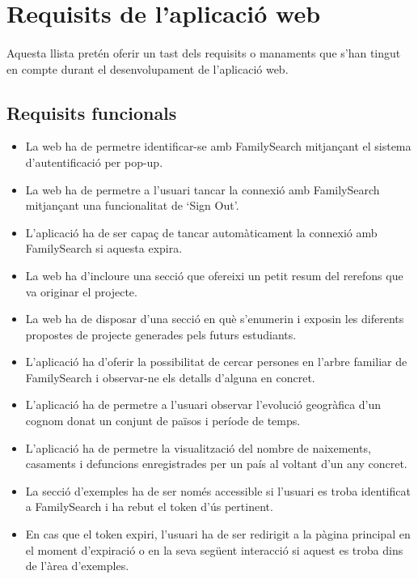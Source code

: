 \section{Requisits de l'aplicació web}

    \paragraph{}
    Aquesta llista pretén oferir un tast dels requisits o manaments que s'han tingut en compte durant el desenvolupament de l'aplicació web.

    \subsection{Requisits funcionals}

    \begin{itemize}
        \item La web ha de permetre identificar-se amb FamilySearch mitjançant el sistema d'autentificació per pop-up.
        \item La web ha de permetre a l'usuari tancar la connexió amb FamilySearch mitjançant una funcionalitat de `Sign Out'.
        \item L'aplicació ha de ser capaç de tancar automàticament la connexió amb FamilySearch si aquesta expira.
        \item La web ha d'incloure una secció que ofereixi un petit resum del rerefons que va originar el projecte.
        \item La web ha de disposar d'una secció en què s'enumerin i exposin les diferents propostes de projecte generades pels futurs estudiants.
        \item L'aplicació ha d'oferir la possibilitat de cercar persones en l'arbre familiar de FamilySearch i observar-ne els detalls d'alguna en concret.
        \item L'aplicació ha de permetre a l'usuari observar l'evolució geogràfica d'un cognom donat un conjunt de països i període de temps.
        \item L'aplicació ha de permetre la visualització del nombre de naixements, casaments i defuncions enregistrades per un país al voltant d'un any concret.
        \item La secció d'exemples ha de ser només accessible si l'usuari es troba identificat a FamilySearch i ha rebut el token d'ús pertinent.
        \item En cas que el token expiri, l'usuari ha de ser redirigit a la pàgina principal en el moment d'expiració o en la seva següent interacció si aquest es troba dins de l'àrea d'exemples.

\end{itemize}
